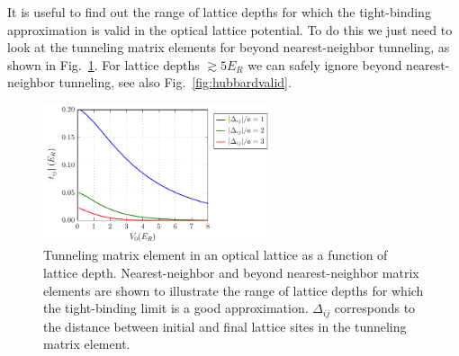 \documentclass[oneside,11pt]{memoir}
\begin{document}
It is useful to find out the range of lattice depths for which the
tight-binding approximation is valid in the optical lattice potential.  To do
this we just need to look at the tunneling matrix elements for beyond
nearest-neighbor tunneling,  as shown in Fig.~\ref{fig:tightbinding}.  For
lattice depths $\gtrsim 5 E_{R}$  we can safely ignore beyond nearest-neighbor
tunneling, see also Fig.~\ref{fig:hubbardvalid}.  
\begin{figure}
\centering
\includegraphics[width=0.6\textwidth]{../figures/BandStructure_figures/tightbinding_V0_interp.pdf}
\caption[Tunneling matrix elements in a 3D lattice.]{\small Tunneling matrix
element in an optical lattice as a function of lattice depth.  Nearest-neighbor
and beyond nearest-neighbor matrix elements are shown to illustrate the range
of lattice depths for which the tight-binding limit is a good approximation.
$\Delta_{ij}$ corresponds to the distance between initial and final lattice
sites in the tunneling matrix element.  } \label{fig:tightbinding}
\end{figure}
\end{document}
